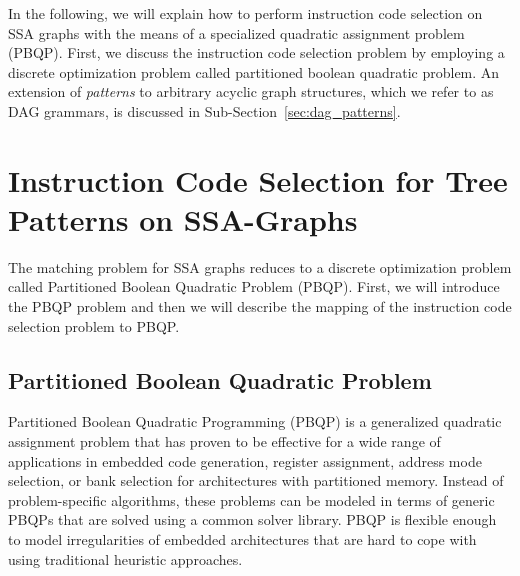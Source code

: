 In the following, we will explain how to perform instruction code selection
on SSA graphs with the means of a specialized quadratic assignment
problem (PBQP). First, we discuss the instruction code selection problem by
employing a discrete optimization problem called partitioned boolean
quadratic problem.  An extension of \emph{patterns} to arbitrary
acyclic graph structures, which we refer to as DAG grammars, is
discussed in Sub-Section~\ref{sec:dag_patterns}.

\section{Instruction Code Selection for Tree Patterns on SSA-Graphs}
The matching problem for SSA graphs reduces to a discrete optimization
problem called Partitioned Boolean Quadratic Problem (PBQP).  First,
we will introduce the PBQP problem and then we will describe the
mapping of the instruction code selection problem to PBQP.

\subsection{Partitioned Boolean Quadratic Problem}
\label{sec:pbqp}
Partitioned Boolean Quadratic Programming (PBQP) is a generalized
quadratic assignment problem that has proven to be effective for a
wide range of applications in embedded code generation, \eg
register assignment, address mode selection, or
bank selection for architectures with partitioned memory. Instead of
problem-specific algorithms, these problems can be modeled in terms of
generic {PBQP}s that are solved using a common solver library. PBQP is
flexible enough to model irregularities of embedded architectures that
are hard to cope with using traditional heuristic approaches.

